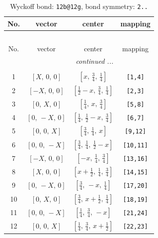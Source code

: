 \documentclass[fleqn,8pt]{jsarticle}
\begin{document}
\renewcommand{\arraystretch}{1.2}
\begin{longtable}{cccc}
\caption{Wyckoff bond: {\tt 12b@12g}, bond symmetry: {\tt 2..}}
 \\
 \hline \hline
No. & vector & center & mapping \\ \hline \endfirsthead

\multicolumn{3}{l}{\tablename\ \thetable{}} \\
 \hline \hline
No. & vector & center & mapping \\ \hline \endhead

 \hline \hline
\multicolumn{3}{r}{\footnotesize\it continued ...} \\ \endfoot

 \hline \hline
\multicolumn{3}{r}{} \\ \endlastfoot

1 & $\left[ X,\, 0,\, 0 \right]$ & $\left[ x,\, \frac{3}{4},\, \frac{1}{4} \right]$ & {\tt [1,4]} \\ \hline
2 & $\left[ - X,\, 0,\, 0 \right]$ & $\left[ \frac{1}{2} - x,\, \frac{3}{4},\, \frac{1}{4} \right]$ & {\tt [2,3]} \\ \hline
3 & $\left[ 0,\, X,\, 0 \right]$ & $\left[ \frac{1}{4},\, x,\, \frac{3}{4} \right]$ & {\tt [5,8]} \\ \hline
4 & $\left[ 0,\, - X,\, 0 \right]$ & $\left[ \frac{1}{4},\, \frac{1}{2} - x,\, \frac{3}{4} \right]$ & {\tt [6,7]} \\ \hline
5 & $\left[ 0,\, 0,\, X \right]$ & $\left[ \frac{3}{4},\, \frac{1}{4},\, x \right]$ & {\tt [9,12]} \\ \hline
6 & $\left[ 0,\, 0,\, - X \right]$ & $\left[ \frac{3}{4},\, \frac{1}{4},\, \frac{1}{2} - x \right]$ & {\tt [10,11]} \\ \hline
7 & $\left[ - X,\, 0,\, 0 \right]$ & $\left[ - x,\, \frac{1}{4},\, \frac{3}{4} \right]$ & {\tt [13,16]} \\ \hline
8 & $\left[ X,\, 0,\, 0 \right]$ & $\left[ x + \frac{1}{2},\, \frac{1}{4},\, \frac{3}{4} \right]$ & {\tt [14,15]} \\ \hline
9 & $\left[ 0,\, - X,\, 0 \right]$ & $\left[ \frac{3}{4},\, - x,\, \frac{1}{4} \right]$ & {\tt [17,20]} \\ \hline
10 & $\left[ 0,\, X,\, 0 \right]$ & $\left[ \frac{3}{4},\, x + \frac{1}{2},\, \frac{1}{4} \right]$ & {\tt [18,19]} \\ \hline
11 & $\left[ 0,\, 0,\, - X \right]$ & $\left[ \frac{1}{4},\, \frac{3}{4},\, - x \right]$ & {\tt [21,24]} \\ \hline
12 & $\left[ 0,\, 0,\, X \right]$ & $\left[ \frac{1}{4},\, \frac{3}{4},\, x + \frac{1}{2} \right]$ & {\tt [22,23]} \\
\end{longtable}
\end{document}
